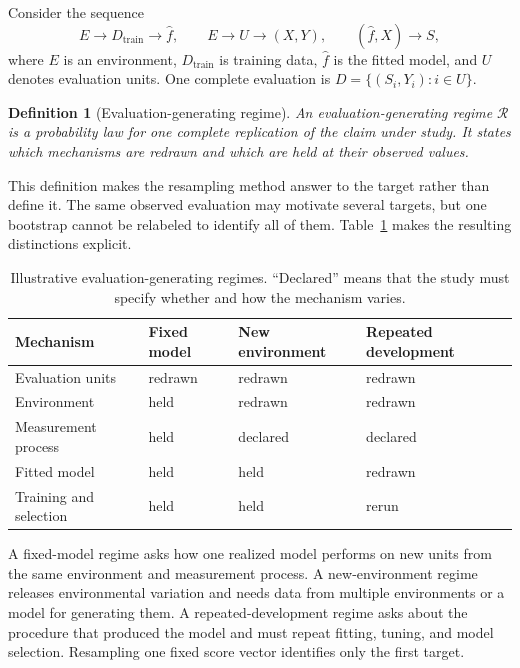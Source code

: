 \documentclass[11pt]{article}
\newcommand{\Regime}{\mathcal{R}}
\newtheorem{definition}{Definition}
\theoremstyle{remark}
\begin{document}
Consider the sequence
\[
E
\longrightarrow D_{\mathrm{train}}
\longrightarrow \widehat f,
\qquad
E\longrightarrow U\longrightarrow(X,Y),
\qquad
(\widehat f,X)\longrightarrow S,
\]
where $E$ is an environment, $D_{\mathrm{train}}$ is training data, $\widehat f$ is the fitted model, and $U$ denotes evaluation units. One complete evaluation is $D=\{(S_i,Y_i):i\in U\}$.

\begin{definition}[Evaluation-generating regime]
An evaluation-generating regime $\Regime$ is a probability law for one complete replication of the claim under study. It states which mechanisms are redrawn and which are held at their observed values.
\end{definition}

This definition makes the resampling method answer to the target rather than define it. The same observed evaluation may motivate several targets, but one bootstrap cannot be relabeled to identify all of them. Table~\ref{tab:regimes} makes the resulting distinctions explicit.

\begin{table}[ht]
\centering
\caption{Illustrative evaluation-generating regimes. ``Declared'' means that the study must specify whether and how the mechanism varies.}
\label{tab:regimes}
\begin{tabularx}{\textwidth}{@{}>{\raggedright\arraybackslash}p{}XXX@{}}
\toprule
Mechanism & Fixed model & New environment & Repeated development \\
\midrule
Evaluation units & redrawn & redrawn & redrawn \\
Environment & held & redrawn & redrawn \\
Measurement process & held & declared & declared \\
Fitted model & held & held & redrawn \\
Training and selection & held & held & rerun \\
\bottomrule
\end{tabularx}
\end{table}

A fixed-model regime asks how one realized model performs on new units from the same environment and measurement process. A new-environment regime releases environmental variation and needs data from multiple environments or a model for generating them. A repeated-development regime asks about the procedure that produced the model and must repeat fitting, tuning, and model selection. Resampling one fixed score vector identifies only the first target.
\end{document}
